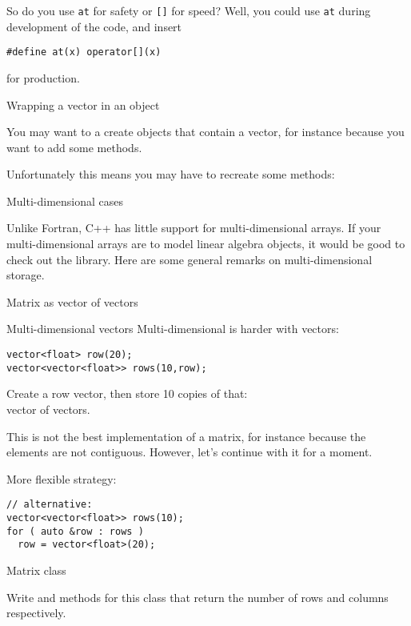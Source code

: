So do you use \lstinline{at} for safety or \lstinline{[]} for speed? Well, you could
use \lstinline{at} during development of the code, and insert
\begin{lstlisting}
#define at(x) operator[](x)
\end{lstlisting}
for production.

 {Wrapping a vector in an object}

You may want to a create objects that contain a vector, for instance
because you want to add some methods.
%

Unfortunately this means you may have to recreate some methods:
%

 {Multi-dimensional cases}

Unlike Fortran, C++ has little support for multi-dimensional
arrays. If your multi-dimensional arrays are to model linear algebra
objects, it would be good to check out the 
library. Here are some general remarks on multi-dimensional storage.

 {Matrix as vector of vectors}

\begin{block}{Multi-dimensional vectors}
  \label{sl:multi-vector}
  Multi-dimensional is harder with vectors:
\begin{lstlisting}
vector<float> row(20);
vector<vector<float>> rows(10,row);
\end{lstlisting}
Create a row vector, then store 10 copies of that:\\
vector of vectors.
\end{block}

This is not the best implementation of a matrix, for instance because
the elements are not contiguous. However, let's continue with it for a moment.

\begin{remark}
More flexible strategy:
\begin{lstlisting}
// alternative:
vector<vector<float>> rows(10);
for ( auto &row : rows )
  row = vector<float>(20);
\end{lstlisting}
\end{remark}

\begin{block}{Matrix class}
  \label{sl:matrix-class}
  \lstset{style=snippetcode}
\end{block}

\begin{exercise}
  \label{ex:matrixclass-rowcol1}
  Write  and  methods for this class that return
  the number of rows and columns respectively.
\end{exercise}

